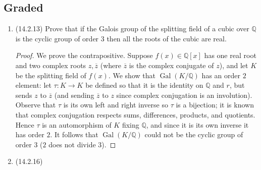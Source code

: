 \documentclass[11pt]{article}
\newcommand{\cbr}[1]{\left\{#1\right\}}
\DeclareMathOperator{\Gal}{Gal}
\begin{document}
\subsection*{Graded}
\begin{enumerate}
    \item (14.2.13) Prove that if the Galois group of the splitting field of a cubic over $\mathbb{Q}$ is the cyclic group of order $3$ then all the roots of the cubic are real. \begin{proof}
        We prove the contrapositive. Suppose $f(x)\in\mathbb{Q}[x]$ has one real root and two complex roots $z,\overline{z}$ (where $\overline{z}$ is the complex conjugate of $z$), and let $K$ be the splitting field of $f(x)$. We show that $\Gal(K/\mathbb{Q})$ has an order $2$ element: let $\tau\colon K\to K$ be defined so that it is the identity on $\mathbb{Q}$ and $r$, but sends $z$ to $\overline{z}$ (and sending $\overline{z}$ to $z$ since complex conjugation is an involution). Observe that $\tau$ is its own left and right inverse so $\tau$ is a bijection; it is known that complex conjugation respects sums, differences, products, and quotients. Hence $\tau$ is an automorphism of $K$ fixing $\mathbb{Q}$, and since it is its own inverse it has order $2$. It follows that $\Gal(K/\mathbb{Q})$ could not be the cyclic group of order $3$ ($2$ does not divide $3$).
    \end{proof}
    \item (14.2.16) 
\end{enumerate}
\end{document}
